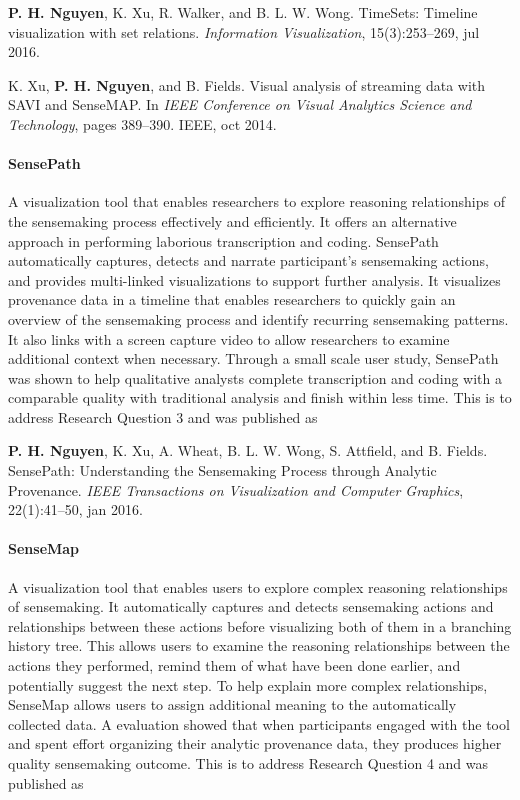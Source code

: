 \textbf{P. H. Nguyen}, K. Xu, R. Walker, and B. L. W. Wong. TimeSets: Timeline visualization with set relations. \textit{Information Visualization}, 15(3):253--269, jul 2016.

K. Xu, \textbf{P. H. Nguyen}, and B. Fields. Visual analysis of streaming data with SAVI and SenseMAP. In \textit{IEEE Conference on Visual Analytics Science and Technology}, pages 389--390. IEEE, oct 2014.

\paragraph{SensePath} A visualization tool that enables researchers to explore reasoning relationships of the sensemaking process effectively and efficiently. It offers an alternative approach in performing laborious transcription and coding. SensePath automatically captures, detects and narrate participant's sensemaking actions, and provides multi-linked visualizations to support further analysis. It visualizes provenance data in a timeline that enables researchers to quickly gain an overview of the sensemaking process and identify recurring sensemaking patterns. It also links with a screen capture video to allow researchers to examine  additional context when necessary. Through a small scale user study, SensePath was shown to help qualitative analysts complete transcription and coding with a comparable quality with traditional analysis and finish within less time. This is to address Research Question 3 and was published as

\textbf{P. H. Nguyen}, K. Xu, A. Wheat, B. L. W. Wong, S. Attfield, and B. Fields. SensePath: Understanding the Sensemaking Process through Analytic Provenance. \textit{IEEE Transactions on Visualization and Computer Graphics}, 22(1):41--50, jan 2016.

\paragraph{SenseMap} A visualization tool that enables users to explore complex reasoning relationships of sensemaking. It automatically captures and detects sensemaking actions and relationships between these actions before visualizing both of them in a branching history tree. This allows users to examine the reasoning relationships between the actions they performed, remind them of what have been done earlier, and potentially suggest the next step. To help explain more complex relationships, SenseMap allows users to assign additional meaning to the automatically collected data. A evaluation showed that when participants engaged with the tool and spent effort organizing their analytic provenance data, they produces higher quality sensemaking outcome. This is to address Research Question 4 and was published as

